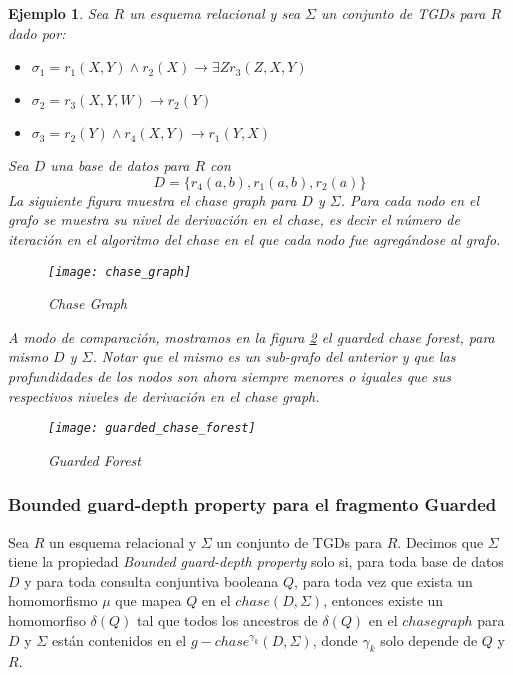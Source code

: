 \documentclass[11pt,a4paper,twoside]{tesis}
\newtheorem{exmp}{Ejemplo}
\begin{document}
\begin{exmp}\label{ejemplo_chase_forest}
    Sea $R$ un esquema relacional y sea $\Sigma$ un conjunto de TGDs para $R$ dado por:
    \begin{itemize}
        \item $\sigma_1 = r_1(X, Y) \land r_2(X) \rightarrow \exists Z r_3(Z, X, Y)$
        \item $\sigma_2 = r_3(X, Y, W) \rightarrow r_2(Y)$
        \item $\sigma_3 = r_2(Y) \land r_4(X, Y) \rightarrow r_1(Y, X)$
    \end{itemize}

Sea $D$ una base de datos para $R$ con $$D=\{r_4(a, b), r_1(a, b), r_2(a)\}$$
La siguiente figura muestra el \textit{chase graph} para $D$ y $\Sigma$. Para cada nodo en el grafo se muestra su \textit{nivel de derivación} en el chase, es decir el número de iteración en el algoritmo del chase en el que cada nodo fue agregándose al grafo.  
    
\begin{figure}[ht]
    \texttt{[image: chase\_graph]}
    \centering
    \caption{Chase Graph}
    \label{fig:chase_graph}
\end{figure}

A modo de comparación, mostramos en la figura \ref{fig:guarded_forest} el \textit{guarded chase forest}, para mismo $D$ y $\Sigma$. Notar que el mismo es un sub-grafo del anterior y que las profundidades de los nodos son ahora siempre menores o iguales que sus respectivos niveles de \textit{derivación} en el  \textit{chase graph}. 

\begin{figure}[ht]
    \texttt{[image: guarded\_chase\_forest]}
    \centering
    \caption{Guarded Forest}
    \label{fig:guarded_forest}
\end{figure}

\end{exmp}

\subsubsection{Bounded guard-depth property para el fragmento Guarded}\label{guarded_forest_subsection}

Sea $R$ un esquema relacional y $\Sigma$ un conjunto de TGDs para $R$. Decimos que $\Sigma$ tiene la propiedad \textit{Bounded guard-depth property} solo si, para toda base de datos $D$ y para toda consulta conjuntiva booleana $Q$, para toda vez que exista un homomorfismo $\mu$ que mapea $Q$ en el $chase(D, \Sigma)$, entonces existe un homomorfiso $\delta(Q)$ tal que todos los ancestros de $\delta(Q)$ en el $chase graph$ para $D$ y $\Sigma$ están contenidos en el $g-chase^{\gamma_k}(D, \Sigma)$, donde $\gamma_k$ solo depende de $Q$ y $R$.
\end{document}

